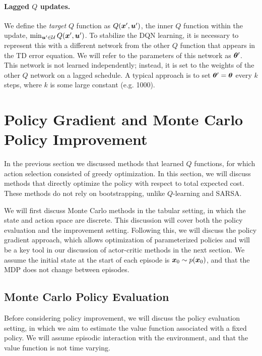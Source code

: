 \paragraph{Lagged $Q$ updates.} We define the \textit{target} $Q$ function as $Q(\bm{x}',\bm{u}')$, the inner $Q$ function within the update, $\min_{\bm{u}' \in \mathcal{U}} Q(\bm{x}',\bm{u}')$. To stabilize the DQN learning, it is necessary to represent this with a different network from the other $Q$ function that appears in the TD error equation. We will refer to the parameters of this network  as $\bm{\theta}'$. This network is not learned independently; instead, it is set to the weights of the other $Q$ network on a lagged schedule. A typical approach is to set $\bm{\theta}' = \bm{\theta}$ every $k$ steps, where $k$ is some large constant (e.g. 1000). 



\section{Policy Gradient and Monte Carlo Policy Improvement}

In the previous section we discussed methods that learned $Q$ functions, for which action selection consisted of greedy optimization. In this section, we will discuss methods that directly optimize the policy with respect to total expected cost. These methods do not rely on bootstrapping, unlike $Q$-learning and SARSA. 

We will first discuss Monte Carlo methods in the tabular setting, in which the state and action space are discrete. This discussion will cover both the policy evaluation and the improvement setting. Following this, we will discuss the policy gradient approach, which allows optimization of parameterized policies and will be a key tool in our discussion of actor-critic methods in the next section. 
We assume the initial state at the start of each episode is $\bm{x}_0 \sim p(\bm{x}_0)$, and that the MDP does not change between episodes. 

\subsection{Monte Carlo Policy Evaluation}

Before considering policy improvement, we will discuss the policy evaluation setting, in which we aim to estimate the value function associated with a fixed policy. We will assume episodic interaction with the environment, and that the value function is not time varying.

